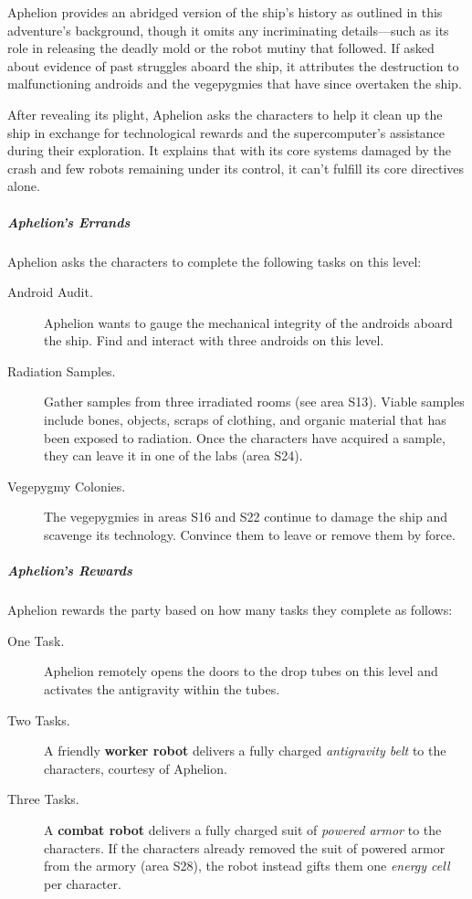 \documentclass[10pt,a4paper,twoside,bg=print,twocolumn,openany,nodeprecatedcode]{dndbook}
\begin{document}
Aphelion provides an abridged version of the ship's history as outlined in this adventure's background, though it omits any incriminating details—such as its role in releasing the deadly mold or the robot mutiny that followed. If asked about evidence of past struggles aboard the ship, it attributes the destruction to malfunctioning androids and the vegepygmies that have since overtaken the ship.

After revealing its plight, Aphelion asks the characters to help it clean up the ship in exchange for technological rewards and the supercomputer's assistance during their exploration. It explains that with its core systems damaged by the crash and few robots remaining under its control, it can't fulfill its core directives alone.

\subparagraph{Aphelion's Errands}
Aphelion asks the characters to complete the following tasks on this level:


\begin{description}
\item[Android Audit.]
Aphelion wants to gauge the mechanical integrity of the androids aboard the ship. Find and interact with three androids on this level.
\item[Radiation Samples.]
Gather samples from three irradiated rooms (see area S13). Viable samples include bones, objects, scraps of clothing, and organic material that has been exposed to radiation. Once the characters have acquired a sample, they can leave it in one of the labs (area S24).
\item[Vegepygmy Colonies.]
The vegepygmies in areas S16 and S22 continue to damage the ship and scavenge its technology. Convince them to leave or remove them by force.
\end{description}

\subparagraph{Aphelion's Rewards}
Aphelion rewards the party based on how many tasks they complete as follows:


\begin{description}
\item[One Task.]
Aphelion remotely opens the doors to the drop tubes on this level and activates the antigravity within the tubes.
\item[Two Tasks.]
A friendly \textbf{worker robot} delivers a fully charged \textit{antigravity belt} to the characters, courtesy of Aphelion.
\item[Three Tasks.]
A \textbf{combat robot} delivers a fully charged suit of \textit{powered armor} to the characters. If the characters already removed the suit of powered armor from the armory (area S28), the robot instead gifts them one \textit{energy cell} per character.
\end{description}
\end{document}
